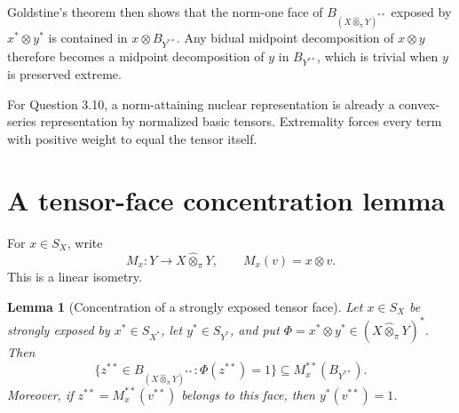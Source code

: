 \documentclass[11pt]{article}
\newtheorem{lemma}[theorem]{Lemma}
\newcommand{\pt}{\widehat{\otimes}_{\pi}}
\begin{document}
Goldstine's theorem then shows that the norm-one face of
$B_{(X\pt Y)^{**}}$ exposed by $x^*\otimes y^*$ is contained in
$x\otimes B_{Y^{**}}$. Any bidual midpoint decomposition of $x\otimes y$
therefore becomes a midpoint decomposition of $y$ in $B_{Y^{**}}$, which is
trivial when $y$ is preserved extreme.

For Question 3.10, a norm-attaining nuclear representation is already a
convex-series representation by normalized basic tensors. Extremality forces
every term with positive weight to equal the tensor itself.

\section{A tensor-face concentration lemma}

For $x\in S_X$, write
\[
  M_x:Y\longrightarrow X\pt Y,\qquad M_x(v)=x\otimes v.
\]
This is a linear isometry.

\begin{lemma}[Concentration of a strongly exposed tensor face]\label{lem:face}
Let $x\in S_X$ be strongly exposed by $x^*\in S_{X^*}$, let
$y^*\in S_{Y^*}$, and put $\Phi=x^*\otimes y^*\in (X\pt Y)^*$. Then
\[
 \{z^{**}\in B_{(X\pt Y)^{**}}:\Phi(z^{**})=1\}
 \subseteq M_x^{**}(B_{Y^{**}}).
\]
Moreover, if $z^{**}=M_x^{**}(v^{**})$ belongs to this face, then
$y^*(v^{**})=1$.
\end{lemma}
\end{document}
